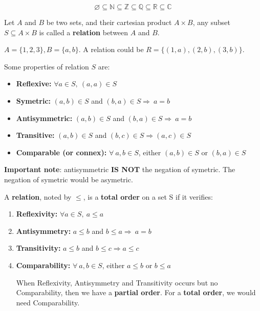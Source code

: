 \documentclass[12pt, a4paper]{book}
\begin{document}
\begin{rem}
  \[
    \varnothing \subseteq \mathbb{N} \subseteq \mathbb{Z} \subseteq \mathbb{Q} \subseteq \mathbb{R} \subseteq \mathbb{C}
  \]
\end{rem}

\begin{defn}
  Let $A$ and $B$ be two sets, and their cartesian product $A \times B$, any subset $S \subseteq A \times B$ is called a \textbf{relation} between $A$ and $B$.
\end{defn}

\begin{exmp}
  $A = \{1,2,3\}, B = \{a,b\}$. A relation could be $R = \{(1,a), (2,b), (3,b)\}$.
\end{exmp}

\begin{defn}
  Some properties of relation $S$ are:
  \begin{itemize}
    \item \textbf{Reflexive:} $\forall a \in S, \ (a,a)\in S$
    \item \textbf{Symetric:} $(a,b)\in S$ and $ (b,a)\in S \Rightarrow \ a=b$
    \item \textbf{Antisymmetric:} $(a,b)\in S$ and $ (b,a)\in S \Rightarrow \ a=b$
    \item \textbf{Transitive:} $(a,b)\in S$ and $(b,c)\in S \Rightarrow (a,c)\in S$
    \item \textbf{Comparable (or connex):} $\forall \ a, b \in S$, either $(a,b)\in S$ or $(b,a)\in S$
  \end{itemize}
  \textbf{Important note}: antisymmetric \textbf{IS NOT} the negation of symetric. The negation of symetric would be asymetric.
\end{defn}

\begin{defn}
  \boldmath
  A \textbf{relation}, noted by $\leq $, is a \textbf{total order} on a set S if it verifies:
  \begin{enumerate}
    \item \textbf{Reflexivity:} $\forall a \in S, \ a \leq a$
    \item \textbf{Antisymmetry:} $a \leq b$ and $ b \leq a \Rightarrow \ a=b$
    \item \textbf{Transitivity:} $a \leq b$ and $b \leq c \Rightarrow a \leq c$
    \item \textbf{Comparability:} $\forall \ a, b \in S$, either $a \leq b$ or $b \leq a$
  
    When Reflexivity, Antisymmetry and Transitivity occurs but no Comparability, then we have a \textbf{partial order}. For a \textbf{total order}, we would need Comparability.
  \end{enumerate}
  \unboldmath
\end{defn}
\end{document}
